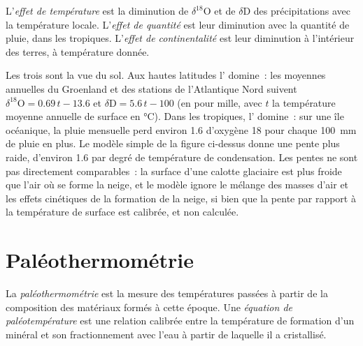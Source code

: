 \begin{definition}\label{def:b3:stable-isotopes:effects}
L'\emph{effet de température} est la
diminution de $\delta^{18}\mathrm O$ et de $\delta\mathrm D$ des précipitations avec la
température locale. L'\emph{effet de quantité} est leur
diminution avec la quantité de pluie, dans les tropiques. L'\emph{effet de
continentalité} est leur diminution à l'intérieur des terres, à
température donnée.
\end{definition}

Les trois sont la  vue du sol. Aux hautes latitudes
l' domine~: les moyennes annuelles du Groenland et des
stations de l'Atlantique Nord suivent $\delta^{18}\mathrm O = 0.69\,t - 13.6$ et $\delta\mathrm D =
5.6\,t - 100$ (en pour mille, avec $t$ la température moyenne annuelle de surface en
\unit{\celsius}). Dans les tropiques, l' domine~: sur une île océanique,
la pluie mensuelle perd environ \qty{1.6}{\permil} d'oxygène 18 pour chaque
\qty{100}{mm} de pluie en plus. Le modèle simple de la figure ci-dessus donne une
pente plus raide, d'environ \qty{1.6}{\permil} par degré de température de condensation. Les
pentes ne sont pas directement comparables~: la surface d'une calotte glaciaire est plus froide
que l'air où se forme la neige, et le modèle ignore le mélange des masses d'air et les
effets cinétiques de la formation de la neige, si bien que la pente par rapport à la
température de surface est calibrée, et non calculée.

\section{Paléothermométrie}\label{sec:b3:stable-isotopes:palaeothermometry}

\begin{definition}
\label{def:b3:stable-isotopes:palaeothermometry}
La \emph{paléothermométrie} est la mesure des températures passées à partir de la
composition des matériaux formés à cette époque. Une
\emph{équation de paléotempérature} est une
relation calibrée entre la température de formation d'un minéral et son
fractionnement avec l'eau à partir de laquelle il a cristallisé.
\end{definition}

